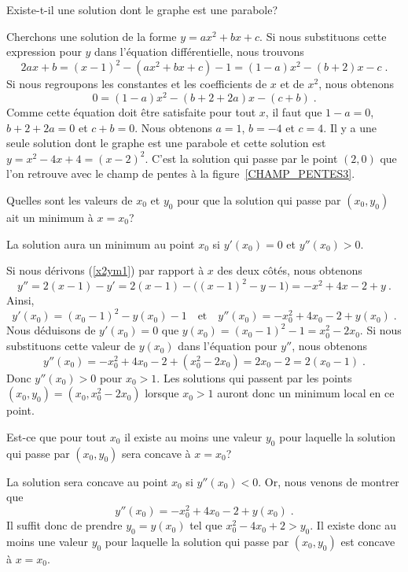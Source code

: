 {\begin{egg}
 Existe-t-il une solution dont le graphe est une parabole?

Cherchons une solution de la forme $y=ax^2+bx+c$.  Si nous
substituons cette expression pour $y$ dans l'équation différentielle,
nous trouvons
\[
2ax +b = (x-1)^2 - (ax^2+bx+c) - 1 = (1-a)x^2 - (b+2)x - c \; .
\]
Si nous regroupons les constantes et les coefficients de $x$ et de $x^2$,
nous obtenons
\[
0 = (1-a)x^2 - (b+2+2a)x - (c+b) \; .
\]
Comme cette équation doit être satisfaite pour tout $x$, il faut que
$1-a=0$, $b+2+2a=0$ et $c+b=0$.  Nous obtenons $a=1$, $b=-4$ et $c=4$.
Il y a une seule solution dont le graphe est une parabole et cette solution
est $y=x^2 -4x + 4 = (x-2)^2$.  C'est la solution qui passe par le
point $(2,0)$ que l'on retrouve avec le champ de pentes à la
figure~\ref{CHAMP_PENTES3}.

 Quelles sont les valeurs de $x_0$ et $y_0$ pour que la
solution qui passe par $(x_0,y_0)$ ait un minimum à $x=x_0$?

La solution aura un minimum au point $x_0$ si
$y'(x_0)=0$ et $y''(x_0) >0$.

Si nous dérivons (\ref{x2ym1}) par rapport à $x$ des deux côtés, nous
obtenons
\[
  y'' = 2(x-1) - y'   = 2(x-1) - \big( (x-1)^2 - y -1 \big)
  = -x^2 + 4x - 2 + y \ .
\]
Ainsi,
\[
y'(x_0) = (x_0-1)^2 - y(x_0) - 1 \quad \text{et}
\quad y''(x_0) =  - x_0^2 + 4 x_0 - 2 + y(x_0) \; .
\]
Nous déduisons de $y'(x_0) = 0$ que $y(x_0)=(x_0-1)^2 - 1  = x_0^2-2x_0$.
Si nous substituons cette valeur de $y(x_0)$ dans l'équation pour $y''$, nous
obtenons
\[
y''(x_0) = -x_0^2 + 4 x_0 - 2 + \left(x_0^2-2x_0\right)
= 2x_0 -  2 = 2(x_0-1) \; .
\]
Donc $y''(x_0)>0$ pour $x_0>1$.  Les solutions qui passent
par les points $(x_0,y_0) = (x_0, x_0^2-2x_0)$ lorsque $x_0>1$
auront donc un minimum local en ce point.


 Est-ce que pour tout $x_0$ il existe au moins une valeur
$y_0$ pour laquelle la solution qui passe par $(x_0,y_0)$ sera concave
à $x=x_0$?

La solution sera concave au point $x_0$ si $y''(x_0) <0$.  Or, nous
venons de montrer que
\[
y''(x_0) = - x_0^2 + 4 x_0 - 2 + y(x_0) \; .
\]
Il suffit donc de prendre $y_0 = y(x_0)$ tel que
$x_0^2 - 4 x_0 +2 >  y_0$.  Il existe donc au moins une valeur
$y_0$ pour laquelle la solution qui passe par $(x_0,y_0)$ est concave
à $x=x_0$.
\end{egg}


}
